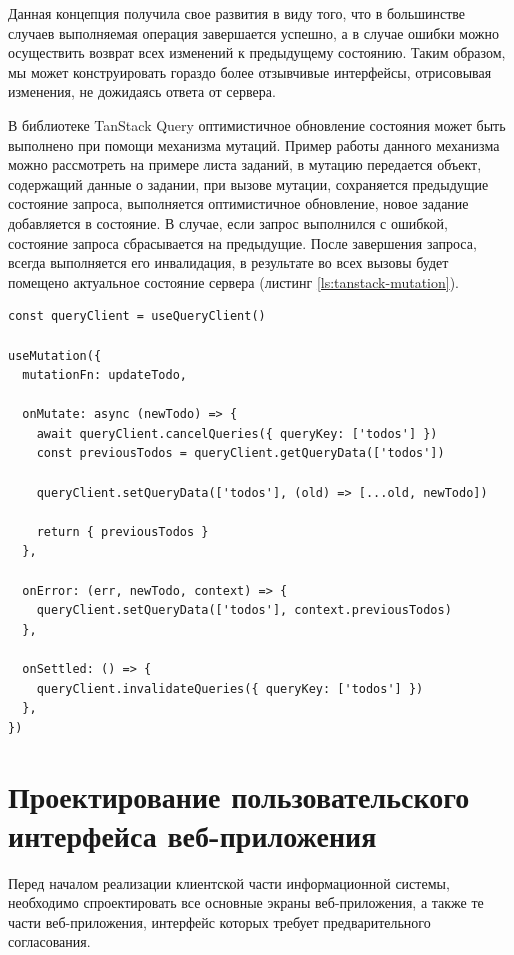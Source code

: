 Данная концепция получила свое развития в виду того, что в большинстве случаев выполняемая операция завершается успешно, а в случае ошибки можно осуществить возврат всех изменений к предыдущему состоянию. Таким образом, мы может конструировать гораздо более отзывчивые интерфейсы, отрисовывая изменения, не дожидаясь ответа от сервера.

В библиотеке TanStack Query оптимистичное обновление состояния может быть выполнено при помощи механизма мутаций. Пример работы данного механизма можно рассмотреть на примере листа заданий, в мутацию передается объект, содержащий данные о задании, при вызове мутации, сохраняется предыдущие состояние запроса, выполняется оптимистичное обновление, новое задание добавляется в состояние. В случае, если запрос выполнился с ошибкой, состояние запроса сбрасывается на предыдущие. После завершения запроса, всегда выполняется его инвалидация, в результате во всех вызовы будет помещено актуальное состояние сервера (листинг \ref{ls:tanstack-mutation}).

\begin{lstlisting}[caption={Пример мутации с оптимистичным обновлением состояния}, label={ls:tanstack-mutation}]
const queryClient = useQueryClient()

useMutation({
  mutationFn: updateTodo,
  
  onMutate: async (newTodo) => {
    await queryClient.cancelQueries({ queryKey: ['todos'] })
    const previousTodos = queryClient.getQueryData(['todos'])

    queryClient.setQueryData(['todos'], (old) => [...old, newTodo])

    return { previousTodos }
  },
  
  onError: (err, newTodo, context) => {
    queryClient.setQueryData(['todos'], context.previousTodos)
  },
  
  onSettled: () => {
    queryClient.invalidateQueries({ queryKey: ['todos'] })
  },
})
\end{lstlisting}

\section{Проектирование пользовательского интерфейса веб-приложения}

Перед началом реализации клиентской части информационной системы, необходимо спроектировать все основные экраны веб-приложения, а также те части веб-приложения, интерфейс которых требует предварительного согласования.

